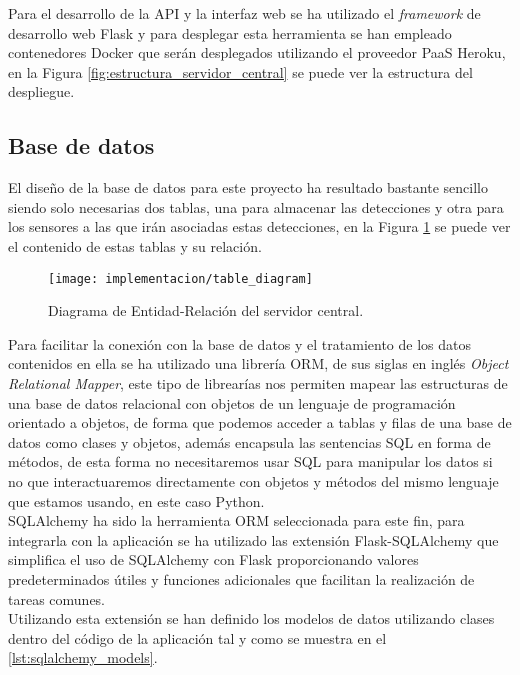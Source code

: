 \documentclass[../proyecto.tex]{subfiles}
\begin{document}
Para el desarrollo de la API y la interfaz web se ha utilizado el \textit{framework} de desarrollo web Flask y para desplegar esta herramienta se han empleado contenedores Docker que serán desplegados utilizando el proveedor PaaS Heroku, en la Figura \ref{fig:estructura_servidor_central} se puede ver la estructura del despliegue.\\

\subsection{Base de datos}

El diseño de la base de datos para este proyecto ha resultado bastante sencillo siendo solo necesarias dos tablas, una para almacenar las detecciones y otra para los sensores a las que irán asociadas estas detecciones, en la Figura \ref{fig:table_diagram} se puede ver el contenido de estas tablas y su relación.

\begin{figure}[H]
\centering
\texttt{[image: implementacion/table\_diagram]}
\caption{Diagrama de Entidad-Relación del servidor central.}
\label{fig:table_diagram}
\end{figure}

Para facilitar la conexión con la base de datos y el tratamiento de los datos contenidos en ella se ha utilizado una librería ORM, de sus siglas en inglés \textit{Object Relational Mapper}, este tipo de librearías nos permiten mapear las estructuras de una base de datos relacional con objetos de un lenguaje de programación orientado a objetos, de forma que podemos acceder a tablas y filas de una base de datos como clases y objetos, además encapsula las sentencias SQL en forma de métodos, de esta forma no necesitaremos usar SQL para manipular los datos si no que interactuaremos directamente con objetos y métodos del mismo lenguaje que estamos usando, en este caso Python.\\

SQLAlchemy \cite{sqlalchemy} ha sido la herramienta ORM seleccionada para este fin, para integrarla con la aplicación se ha utilizado las extensión Flask-SQLAlchemy \cite{flask_sqlalchemy} que simplifica el uso de SQLAlchemy con Flask proporcionando valores predeterminados útiles y funciones adicionales que facilitan la realización de tareas comunes.\\

Utilizando esta extensión se han definido los modelos de datos utilizando clases dentro del código de la aplicación tal y como se muestra en el \autoref{lst:sqlalchemy_models}.\\
\end{document}

